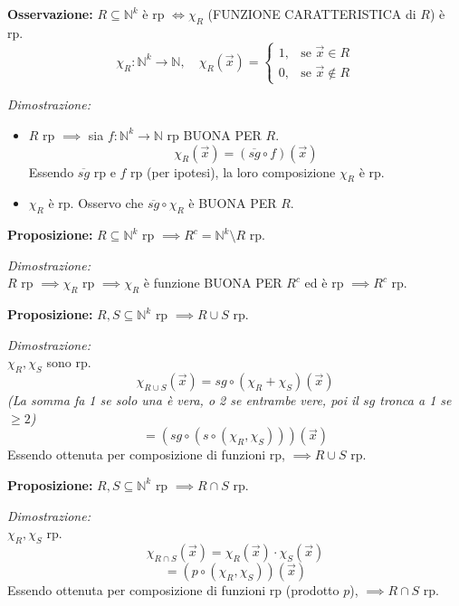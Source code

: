 \vspace{0.4cm}
\textbf{Osservazione:} $R \subseteq \mathbb{N}^k$ è rp $\iff \chi_R$ (FUNZIONE CARATTERISTICA di $R$) è rp.
$$
\chi_R : \mathbb{N}^k \to \mathbb{N}, \quad \chi_R(\vec{x}) = 
\begin{cases} 
1, & \text{se } \vec{x} \in R \\ 
0, & \text{se } \vec{x} \notin R 
\end{cases}
$$

\textit{Dimostrazione:}
\begin{itemize}
    \item[$\implies$)] $R$ rp $\implies$ sia $f: \mathbb{N}^k \to \mathbb{N}$ rp BUONA PER $R$.
    $$ \chi_R(\vec{x}) = (\overline{sg} \circ f)(\vec{x}) $$
    Essendo $\overline{sg}$ rp e $f$ rp (per ipotesi), la loro composizione $\chi_R$ è rp.
    
    \item[$\impliedby$)] $\chi_R$ è rp. Osservo che $\overline{sg} \circ \chi_R$ è BUONA PER $R$.
\end{itemize}

\vspace{0.4cm}
\textbf{Proposizione:} $R \subseteq \mathbb{N}^k$ rp $\implies R^c = \mathbb{N}^k \setminus R$ rp.

\textit{Dimostrazione:} \\
$R$ rp $\implies \chi_R$ rp $\implies \chi_R$ è funzione BUONA PER $R^c$ ed è rp $\implies R^c$ rp.

\vspace{0.4cm}
\textbf{Proposizione:} $R, S \subseteq \mathbb{N}^k$ rp $\implies R \cup S$ rp.

\textit{Dimostrazione:} \\
$\chi_R, \chi_S$ sono rp.
$$ \chi_{R \cup S}(\vec{x}) = sg \circ (\chi_R + \chi_S)(\vec{x}) $$
\textit{(La somma fa 1 se solo una è vera, o 2 se entrambe vere, poi il $sg$ tronca a 1 se $\ge 2$)}
$$ = \left( sg \circ (s \circ (\chi_R, \chi_S)) \right)(\vec{x}) $$
Essendo ottenuta per composizione di funzioni rp, $\implies R \cup S$ rp.


\vspace{0.4cm}
\textbf{Proposizione:} $R, S \subseteq \mathbb{N}^k$ rp $\implies R \cap S$ rp.

\textit{Dimostrazione:} \\
$\chi_R, \chi_S$ rp.
$$ \chi_{R \cap S}(\vec{x}) = \chi_R(\vec{x}) \cdot \chi_S(\vec{x}) $$
$$ = \left( p \circ (\chi_R, \chi_S) \right)(\vec{x}) $$
Essendo ottenuta per composizione di funzioni rp (prodotto $p$), $\implies R \cap S$ rp.

